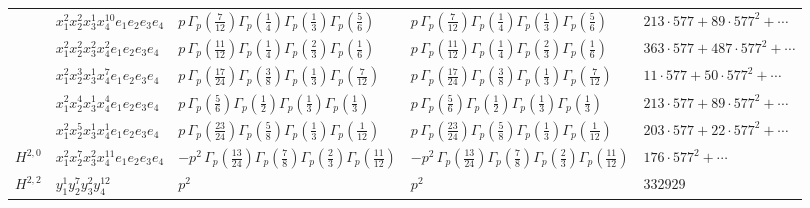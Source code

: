 \documentclass[11pt]{article}
\begin{document}
\begin{table}[ht]
{\begin{tabular}{@{}lllll@{}}
 & $x_{1}^{2} x_{2}^{2} x_{3}^{1} x_{4}^{10}  e_{1} e_{2} e_{3} e_{4}$ & $p \, \Gamma_p \left( \frac{7}{12} \right) \Gamma_p \left( \frac{1}{4} \right) \Gamma_p \left( \frac{1}{3} \right) \Gamma_p \left( \frac{5}{6} \right)$ & $p \, \Gamma_p \left( \frac{7}{12} \right) \Gamma_p \left( \frac{1}{4} \right) \Gamma_p \left( \frac{1}{3} \right) \Gamma_p \left( \frac{5}{6} \right)$ & $213{\cdot}577{+}89{\cdot}577^{2}{+}\cdots$ \\
 & $x_{1}^{2} x_{2}^{2} x_{3}^{2} x_{4}^{2}  e_{1} e_{2} e_{3} e_{4}$ & $p \, \Gamma_p \left( \frac{11}{12} \right) \Gamma_p \left( \frac{1}{4} \right) \Gamma_p \left( \frac{2}{3} \right) \Gamma_p \left( \frac{1}{6} \right)$ & $p \, \Gamma_p \left( \frac{11}{12} \right) \Gamma_p \left( \frac{1}{4} \right) \Gamma_p \left( \frac{2}{3} \right) \Gamma_p \left( \frac{1}{6} \right)$ & $363{\cdot}577{+}487{\cdot}577^{2}{+}\cdots$ \\
 & $x_{1}^{2} x_{2}^{3} x_{3}^{1} x_{4}^{7}  e_{1} e_{2} e_{3} e_{4}$ & $p \, \Gamma_p \left( \frac{17}{24} \right) \Gamma_p \left( \frac{3}{8} \right) \Gamma_p \left( \frac{1}{3} \right) \Gamma_p \left( \frac{7}{12} \right)$ & $p \, \Gamma_p \left( \frac{17}{24} \right) \Gamma_p \left( \frac{3}{8} \right) \Gamma_p \left( \frac{1}{3} \right) \Gamma_p \left( \frac{7}{12} \right)$ & $11{\cdot}577{+}50{\cdot}577^{2}{+}\cdots$ \\
 & $x_{1}^{2} x_{2}^{4} x_{3}^{1} x_{4}^{4}  e_{1} e_{2} e_{3} e_{4}$ & $p \, \Gamma_p \left( \frac{5}{6} \right) \Gamma_p \left( \frac{1}{2} \right) \Gamma_p \left( \frac{1}{3} \right) \Gamma_p \left( \frac{1}{3} \right)$ & $p \, \Gamma_p \left( \frac{5}{6} \right) \Gamma_p \left( \frac{1}{2} \right) \Gamma_p \left( \frac{1}{3} \right) \Gamma_p \left( \frac{1}{3} \right)$ & $213{\cdot}577{+}89{\cdot}577^{2}{+}\cdots$ \\
 & $x_{1}^{2} x_{2}^{5} x_{3}^{1} x_{4}^{1}  e_{1} e_{2} e_{3} e_{4}$ & $p \, \Gamma_p \left( \frac{23}{24} \right) \Gamma_p \left( \frac{5}{8} \right) \Gamma_p \left( \frac{1}{3} \right) \Gamma_p \left( \frac{1}{12} \right)$ & $p \, \Gamma_p \left( \frac{23}{24} \right) \Gamma_p \left( \frac{5}{8} \right) \Gamma_p \left( \frac{1}{3} \right) \Gamma_p \left( \frac{1}{12} \right)$ & $203{\cdot}577{+}22{\cdot}577^{2}{+}\cdots$ \\
\midrule
$H^{2,0}$ & $x_{1}^{2} x_{2}^{7} x_{3}^{2} x_{4}^{11}  e_{1} e_{2} e_{3} e_{4}$ & $- p^{2} \, \Gamma_p \left( \frac{13}{24} \right) \Gamma_p \left( \frac{7}{8} \right) \Gamma_p \left( \frac{2}{3} \right) \Gamma_p \left( \frac{11}{12} \right)$ & $- p^{2} \, \Gamma_p \left( \frac{13}{24} \right) \Gamma_p \left( \frac{7}{8} \right) \Gamma_p \left( \frac{2}{3} \right) \Gamma_p \left( \frac{11}{12} \right)$ & $176{\cdot}577^{2}{+}\cdots$ \\
\midrule
$H^{2,2}$ & $y_{1}^{1} y_{2}^{7} y_{3}^{2} y_{4}^{12}$ & $p^{2} \,$ & $p^{2} \,$ & $332929$ \\
\bottomrule
\end{tabular}
}
\renewcommand{\arraystretch}{1.0}
\end{table}
\end{document}
